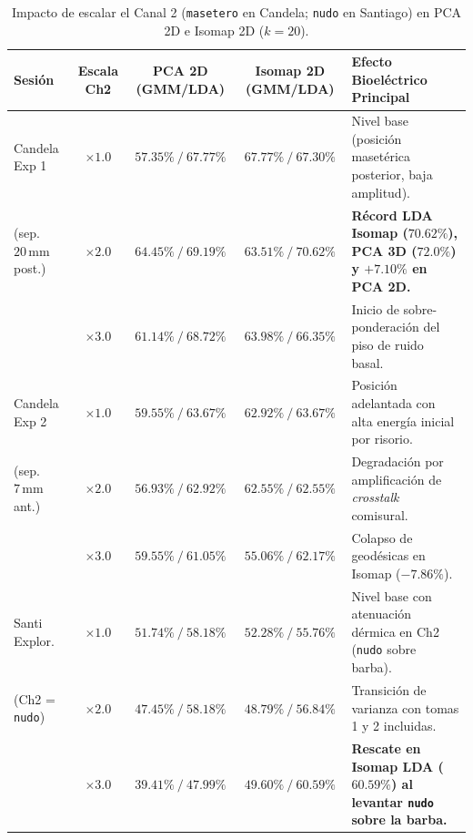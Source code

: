 \documentclass[11pt,a4paper]{article}
\begin{document}
\begin{table}[H]
\centering
\scriptsize
\begin{tabularx}{\textwidth}{p{2.5cm} c c c X}
\toprule
\textbf{Sesión} & \textbf{Escala Ch2} & \textbf{PCA 2D (GMM/LDA)} & \textbf{Isomap 2D (GMM/LDA)} & \textbf{Efecto Bioeléctrico Principal} \\
\midrule
Candela Exp 1 & $\times 1.0$ & $57.35\% \ / \ 67.77\%$ & $67.77\% \ / \ 67.30\%$ & Nivel base (posición masetérica posterior, baja amplitud). \\
(sep. $20\,\text{mm}$ post.) & $\mathbf{\times 2.0}$ & $\mathbf{64.45\%} \ / \ 69.19\%$ & $63.51\% \ / \ \mathbf{70.62\%}$ & \textbf{Récord LDA Isomap ($70.62\%$), PCA 3D ($72.0\%$) y $+7.10\%$ en PCA 2D.} \\
              & $\times 3.0$ & $61.14\% \ / \ 68.72\%$ & $63.98\% \ / \ 66.35\%$ & Inicio de sobre-ponderación del piso de ruido basal. \\
\midrule
Candela Exp 2 & $\times 1.0$ & $59.55\% \ / \ 63.67\%$ & $62.92\% \ / \ 63.67\%$ & Posición adelantada con alta energía inicial por risorio. \\
(sep. $7\,\text{mm}$ ant.)  & $\times 2.0$ & $56.93\% \ / \ 62.92\%$ & $62.55\% \ / \ 62.55\%$ & Degradación por amplificación de \textit{crosstalk} comisural. \\
              & $\times 3.0$ & $59.55\% \ / \ 61.05\%$ & $55.06\% \ / \ 62.17\%$ & Colapso de geodésicas en Isomap ($-7.86\%$). \\
\midrule
Santi Explor. & $\times 1.0$ & $51.74\% \ / \ 58.18\%$ & $52.28\% \ / \ 55.76\%$ & Nivel base con atenuación dérmica en Ch2 (\texttt{nudo} sobre barba). \\
(Ch2 = \texttt{nudo}) & $\times 2.0$ & $47.45\% \ / \ 58.18\%$ & $48.79\% \ / \ 56.84\%$ & Transición de varianza con tomas 1 y 2 incluidas. \\
              & $\mathbf{\times 3.0}$ & $39.41\% \ / \ 47.99\%$ & $49.60\% \ / \ \mathbf{60.59\%}$ & \textbf{Rescate en Isomap LDA ($60.59\%$) al levantar \texttt{nudo} sobre la barba.} \\
\bottomrule
\end{tabularx}
\caption{Impacto de escalar el Canal 2 (\texttt{masetero} en Candela; \texttt{nudo} en Santiago) en PCA 2D e Isomap 2D ($k=20$).}
\label{tab:masetero_amplificado}
\end{table}
\end{document}
